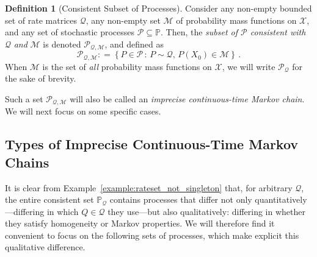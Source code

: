 \documentclass[10pt,a4paper]{paper}
\theoremstyle{definition}
\newtheorem{definition}{Definition}
\newcommand{\states}{\mathcal{X}}
\newcommand{\processes}{\mathbb{P}}
\newcommand{\rateset}{\mathcal{Q}}
\newcommand{\coloneqq}{:\!=}
\begin{document}
\begin{definition}[Consistent Subset of Processes]\label{def:consistent_process_set}
Consider any non-empty bounded set of rate matrices $\rateset$, any non-empty set $\mathcal{M}$ of probability mass functions on $\states$, and any set of stochastic processes $\mathcal{P}\subseteq\processes$. Then, the \emph{subset of $\mathcal{P}$ consistent with} $\rateset$ \emph{and} $\mathcal{M}$ is denoted $\mathcal{P}_{\rateset,\mathcal{M}}$, and defined as
\begin{equation*}
\mathcal{P}_{\rateset,\mathcal{M}} \coloneqq \left\{P\in\mathcal{P}\,:\,P\sim\rateset,\,P(X_0)\in\mathcal{M}\right\}\,.
\end{equation*}
When $\mathcal{M}$ is the set of \emph{all} probability mass functions on $\states$, we will write $\mathcal{P}_{\rateset}$ for the sake of brevity.
\end{definition}
Such a set $\mathcal{P}_{\rateset,\mathcal{M}}$ will also be called an \emph{imprecise continuous-time Markov chain}. We will next focus on some specific cases.

\subsection{Types of Imprecise Continuous-Time Markov Chains}\label{subsec:types_ictmc}

It is clear from Example~\ref{example:rateset_not_singleton} that, for arbitrary $\rateset$, the entire consistent set $\processes_\rateset$ contains processes that differ not only quantitatively---differing in which $Q\in\rateset$ they use---but also qualitatively: differing in whether they satisfy homogeneity or Markov properties. We will therefore find it convenient to focus on the following sets of processes, which make explicit this qualitative difference.
\end{document}
